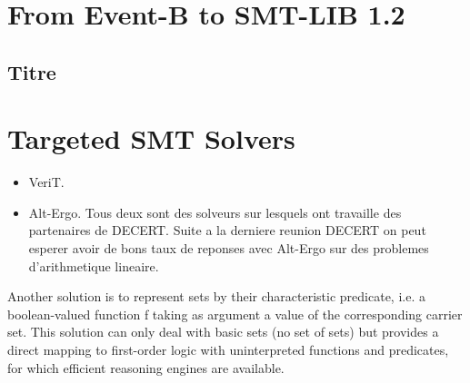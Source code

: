 \section{From Event-B to SMT-LIB 1.2}

\subsection{Titre}

\paragraph{}

\section{Targeted SMT Solvers}
\begin{itemize}
\item VeriT.
\item Alt-Ergo.
Tous deux sont des solveurs sur lesquels ont travaille des partenaires de DECERT.
Suite a la derniere reunion DECERT on peut esperer avoir de bons taux de reponses avec Alt-Ergo sur des problemes d'arithmetique lineaire.
\end{itemize}


Another solution is to represent sets by
their characteristic predicate, i.e. a boolean-valued function f taking as argument a value of the corresponding carrier
set. This solution can only deal with basic sets (no set of sets) but provides a
direct mapping to first-order logic with uninterpreted functions and predicates, for which efficient reasoning engines
are available.